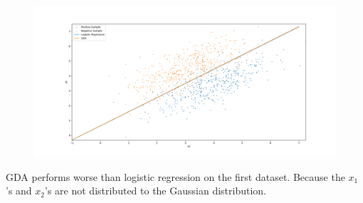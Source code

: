 \begin{answer}
	\begin{figure}[h]
		\centering
		\includegraphics[width=1.0\linewidth]{01-linreg/assets/dataset2}
		\caption[Dataset 2 And Decision Boundaries]{}
		\label{fig:dataset2}
	\end{figure}
	
	GDA performs worse than logistic regression on the first dataset. Because the $x_1$'s and $x_2$'s are not distributed to the Gaussian distribution.
\end{answer}